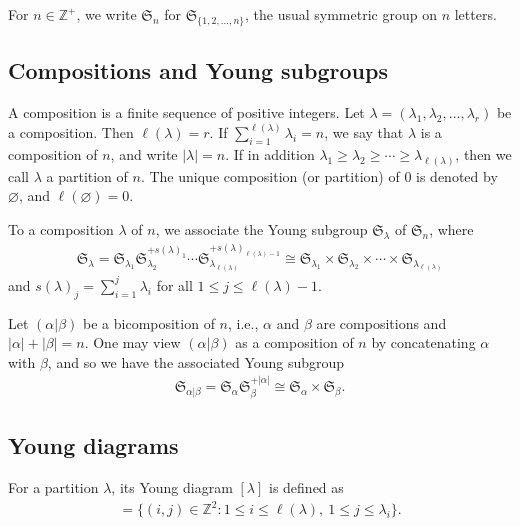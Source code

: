 \documentclass[11pt]{article}
\newcommand{\sym}[1]{\mathfrak{S}_{#1}}
\newcommand{\tlsym}[2]{\mathfrak{S}_{#1}^{+#2}}
\begin{document}
For $n \in \mathbb{Z}^+$, we write $\sym{n}$ for $\sym{\{1,2,\dotsc, n\}}$, the usual symmetric group on $n$ letters.

\subsection{Compositions and Young subgroups}

A composition is a finite sequence of positive integers. Let $\lambda = (\lambda_1,\lambda_2,\dotsc, \lambda_r)$ be a composition. Then $\ell(\lambda) = r$. If $\sum\limits_{i=1}^{\ell(\lambda)} \lambda_i = n$, we say that $\lambda$ is a composition of $n$, and write $|\lambda| = n$. If in addition $\lambda_1 \geq \lambda_2 \geq \dotsb \geq \lambda_{\ell(\lambda)}$, then we call $\lambda$ a partition of $n$. The unique composition (or partition) of 0 is denoted by $\varnothing$, and $\ell(\varnothing)=0$.

To a composition $\lambda$ of $n$, we associate the Young subgroup $\sym{\lambda}$ of $\sym{n}$, where{\samepage
\begin{gather*}
\sym{\lambda} = \sym{\lambda_1} \tlsym{\lambda_2}{s(\lambda)_1} \dotsm \tlsym{\lambda_{\ell(\lambda)}}{s(\lambda)_{\ell(\lambda)-1}} \cong \sym{\lambda_1} \times \sym{\lambda_2} \times \dotsb \times \sym{\lambda_{\ell(\lambda)}}
\end{gather*}
and $s(\lambda)_j = \sum\limits_{i=1}^j \lambda_i$ for all $1 \leq j \leq \ell(\lambda)-1$.}

Let $(\alpha|\beta)$ be a bicomposition of $n$, i.e., $\alpha$ and $\beta$ are compositions and $|\alpha| + |\beta| = n$. One may view $(\alpha|\beta)$ as a composition of $n$ by concatenating $\alpha$ with $\beta$, and so we have the associated Young subgroup
\begin{gather*}
\sym{\alpha|\beta} = \sym{\alpha} \tlsym{\beta}{|\alpha|} \cong \sym{\alpha} \times \sym{\beta}.\end{gather*}

\subsection{Young diagrams}

For a partition $\lambda$, its Young diagram $[\lambda]$ is defined as
\begin{gather*}
[\lambda] = \big\{ (i,j) \in \mathbb{Z}^2 \colon 1\leq i \leq \ell(\lambda),\ 1 \leq j \leq \lambda_i \big\}.
\end{gather*}
\end{document}

